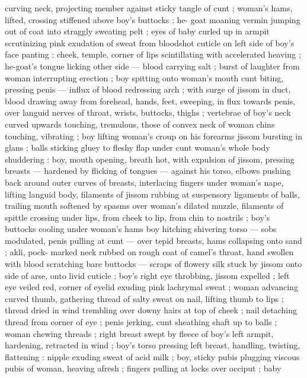 curving neck, projecting member against sticky tangle of cunt ; 
woman's hams, lifted, crossing stiffened above boy's buttocks ; he- 
goat moaning {\col} vermin jumping out of coat into straggly sweating 
pelt ; eyes of baby curled up in armpit scrutinizing pink exudation of 
sweat from bloodshot cuticle on left side of boy's face panting : 
cheek, temple, corner of lips scintillating with accelerated heaving ; 
he-goat's tongue licking other side --- blood carrying salt ; burst of 
laughter from woman interrupting erection ; boy spitting onto 
woman's mouth {\col} cunt biting, pressing penis --- influx of blood 
redressing arch ; with surge of jissom in duct, blood drawing away 
from forehead, hands, feet, sweeping, in flux towards penis, over 
languid nerves of throat, wrists, buttocks, thighs ; vertebrae of boy's 
neck curved upwards touching, tremulous, those of convex neck of 
woman {\col} chins touching, vibrating ; boy lifting woman's croup on his 
forearms {\col} jissom bursting in glans ; balls sticking gluey to fleshy flap 
under cunt {\col} woman's whole body shuddering : boy, mouth opening, 
breath hot, with expulsion of jissom, pressing breasts --- hardened 
by flicking of tongues --- against his torso, elbows pushing back 
around outer curves of breasts, interlacing fingers under woman's 
nape, lifting languid body, filaments of jissom rubbing at suspensory 
ligaments of balls, trailing mouth softened by spasms over woman's 
dilated muzzle, filaments of spittle crossing under lips, from cheek to 
lip, from chin to nostrils ; boy's buttocks cooling under woman's 
hams {\col} boy hitching shivering torso --- sobs modulated, penis pulling 
at cunt --- over tepid breasts, hams collapsing onto sand ; akli, pock- 
marked neck rubbed on rough coat of camel's throat, hand swollen 
with blood scratching bare buttocks --- scraps of flowery silk stuck 
by jissom onto side of arse, onto livid cuticle ; boy's right eye 
throbbing, jissom expelled ; left eye veiled red, corner of eyelid 
exuding pink lachrymal sweat ; woman advancing curved thumb, 
gathering thread of salty sweat on nail, lifting thumb to lips ; thread 
dried in wind trembling over downy hairs at top of cheek ; nail 
detaching thread from corner of eye ; penis jerking, cunt sheathing 
shaft up to balls ; woman chewing threads ; right breast swept by 
fleece of boy's left armpit, hardening, retracted in wind ; boy's torso 
pressing left breast, handling, twisting, flattening : nipple exuding 
sweat of acid milk ; boy, sticky pubis plugging viscous pubis of 
woman, heaving afresh ; fingers pulling at locks over occiput ; baby 
